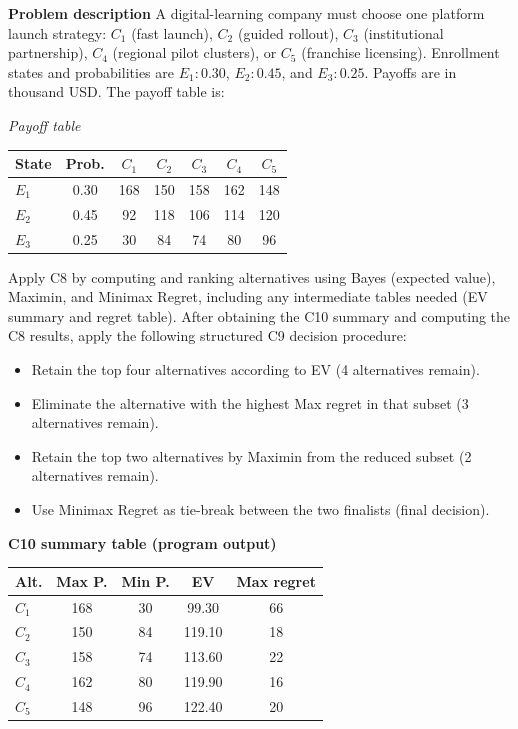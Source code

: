 \begin{ExamProblems}
		\newpage
		\item
		\textbf{Problem description}
		A digital-learning company must choose one platform launch strategy: $C_1$ (fast launch), $C_2$ (guided rollout), $C_3$ (institutional partnership), $C_4$ (regional pilot clusters), or $C_5$ (franchise licensing).
		Enrollment states and probabilities are $E_1:0.30$, $E_2:0.45$, and $E_3:0.25$. Payoffs are in thousand USD. The payoff table is:
		
		\begin{center}
			\textit{Payoff table} \\
			\begin{tabular}{l c c c c c c}
				\hline
				State& Prob. & $C_1$ & $C_2$ & $C_3$ & $C_4$ & $C_5$ \\
				\hline
				$E_1$ & 0.30 & 168 & 150 & 158 & 162 & 148 \\
				$E_2$ & 0.45 & 92 & 118 & 106 & 114 & 120 \\
				$E_3$ & 0.25 & 30 & 84 & 74 & 80 & 96 \\
				\hline
			\end{tabular}
		\end{center}
		
		Apply C8 by computing and ranking alternatives using Bayes (expected value), Maximin, and Minimax Regret, including any intermediate tables needed (EV summary and regret table).
		After obtaining the C10 summary and computing the C8 results, apply the following structured C9 decision procedure:
		\begin{itemize}
			\item Retain the top four alternatives according to EV (4 alternatives remain).
			\item Eliminate the alternative with the highest Max regret in that subset (3 alternatives remain).
			\item Retain the top two alternatives by Maximin from the reduced subset (2 alternatives remain).
			\item Use Minimax Regret as tie-break between the two finalists (final decision).
		\end{itemize}
		
		\vspace{0.25cm}
		
		\textbf{C10 summary table (program output)}\par
		\begin{center}
			\begin{tabular}{l c c c c}
				\hline
				Alt. & Max P. & Min P. & EV & Max regret \\
				\hline
				$C_1$ & 168 & 30 & 99.30 & 66 \\
				$C_2$ & 150 & 84 & 119.10 & 18 \\
				$C_3$ & 158 & 74 & 113.60 & 22 \\
				$C_4$ & 162 & 80 & 119.90 & 16 \\
				$C_5$ & 148 & 96 & 122.40 & 20 \\
				\hline
			\end{tabular}
		\end{center}
		

\end{ExamProblems}
